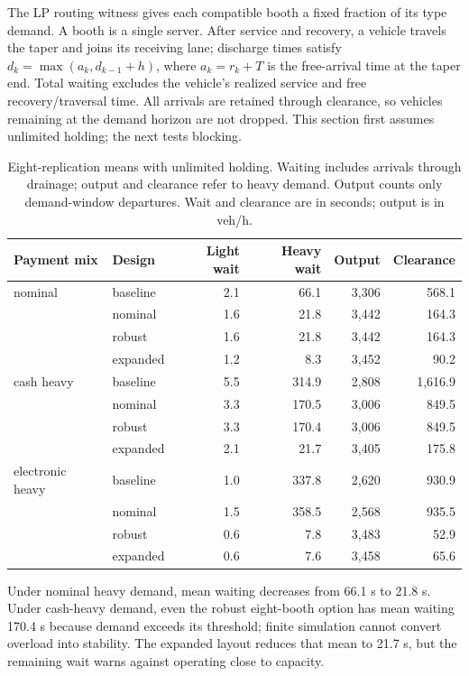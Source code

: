 \documentclass[12pt,letterpaper]{article}
\begin{document}
The LP routing witness gives each compatible booth a fixed fraction of its type demand. A booth is a single server. After service and recovery, a vehicle travels the taper and joins its receiving lane; discharge times satisfy $d_k=\max(a_k,d_{k-1}+h)$, where $a_k=r_k+T$ is the free-arrival time at the taper end. Total waiting excludes the vehicle's realized service and free recovery/traversal time. All arrivals are retained through clearance, so vehicles remaining at the demand horizon are not dropped. This section first assumes unlimited holding; the next tests blocking.

\begin{table}[H]\centering\small\caption{Eight-replication means with unlimited holding. Waiting includes arrivals through drainage; output and clearance refer to heavy demand. Output counts only demand-window departures. Wait and clearance are in seconds; output is in veh/h.}\label{tab:queues}\begin{tabular}{@{}llrrrr@{}}\toprule
Payment mix & Design & Light wait & Heavy wait & Output & Clearance\\\midrule
nominal & baseline & 2.1 & 66.1 & 3,306 & 568.1\\
 & nominal & 1.6 & 21.8 & 3,442 & 164.3\\
 & robust & 1.6 & 21.8 & 3,442 & 164.3\\
 & expanded & 1.2 & 8.3 & 3,452 & 90.2\\
cash heavy & baseline & 5.5 & 314.9 & 2,808 & 1,616.9\\
 & nominal & 3.3 & 170.5 & 3,006 & 849.5\\
 & robust & 3.3 & 170.4 & 3,006 & 849.5\\
 & expanded & 2.1 & 21.7 & 3,405 & 175.8\\
electronic heavy & baseline & 1.0 & 337.8 & 2,620 & 930.9\\
 & nominal & 1.5 & 358.5 & 2,568 & 935.5\\
 & robust & 0.6 & 7.8 & 3,483 & 52.9\\
 & expanded & 0.6 & 7.6 & 3,458 & 65.6\\
\bottomrule\end{tabular}\end{table}
Under nominal heavy demand, mean waiting decreases from 66.1 s to 21.8 s. Under cash-heavy demand, even the robust eight-booth option has mean waiting 170.4 s because demand exceeds its threshold; finite simulation cannot convert overload into stability. The expanded layout reduces that mean to 21.7 s, but the remaining wait warns against operating close to capacity.
\end{document}
